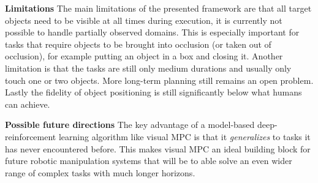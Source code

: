 \documentclass[10pt,journal,compsoc]{IEEEtran}
\begin{document}


\noindent \textbf{Limitations}
The main limitations of the presented framework are that all target objects need to be visible at all times during execution, it is currently not possible to handle partially observed domains. This is especially important for tasks that require objects to be brought into occlusion (or taken out of occlusion), for example putting an object in a box and closing it. Another limitation is that the tasks are still only medium durations and usually only touch one or two objects. More long-term planning still remains an open problem. Lastly the fidelity of object positioning is still significantly below what humans can achieve.

\noindent \textbf{Possible future directions}
The key advantage of a model-based deep-reinforcement learning algorithm like visual MPC is that it \emph{generalizes} to tasks it has never encountered before. This makes visual MPC an ideal building block for future robotic manipulation systems that will be to able solve an even wider range of complex tasks with much longer horizons. 
\end{document}
